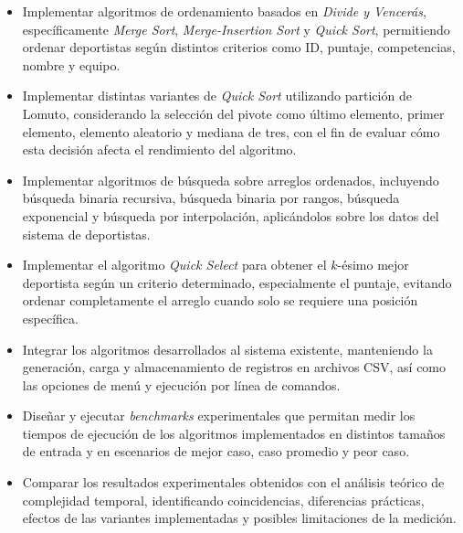\begin{itemize}
    \item Implementar algoritmos de ordenamiento basados en \textit{Divide y Vencerás}, específicamente \textit{Merge Sort}, \textit{Merge-Insertion Sort} y \textit{Quick Sort}, permitiendo ordenar deportistas según distintos criterios como ID, puntaje, competencias, nombre y equipo. \\

    \item Implementar distintas variantes de \textit{Quick Sort} utilizando partición de Lomuto, considerando la selección del pivote como último elemento, primer elemento, elemento aleatorio y mediana de tres, con el fin de evaluar cómo esta decisión afecta el rendimiento del algoritmo.  \\

    \item Implementar algoritmos de búsqueda sobre arreglos ordenados, incluyendo búsqueda binaria recursiva, búsqueda binaria por rangos, búsqueda exponencial y búsqueda por interpolación, aplicándolos sobre los datos del sistema de deportistas.  \\

    \item Implementar el algoritmo \textit{Quick Select} para obtener el $k$-ésimo mejor deportista según un criterio determinado, especialmente el puntaje, evitando ordenar completamente el arreglo cuando solo se requiere una posición específica.  \\

    \item Integrar los algoritmos desarrollados al sistema existente, manteniendo la generación, carga y almacenamiento de registros en archivos CSV, así como las opciones de menú y ejecución por línea de comandos.  \\

    \item Diseñar y ejecutar \textit{benchmarks} experimentales que permitan medir los tiempos de ejecución de los algoritmos implementados en distintos tamaños de entrada y en escenarios de mejor caso, caso promedio y  peor caso.  \\

    \item Comparar los resultados experimentales obtenidos con el análisis teórico de complejidad temporal, identificando coincidencias, diferencias prácticas, efectos de las variantes implementadas y posibles limitaciones de la medición.  \\
\end{itemize}